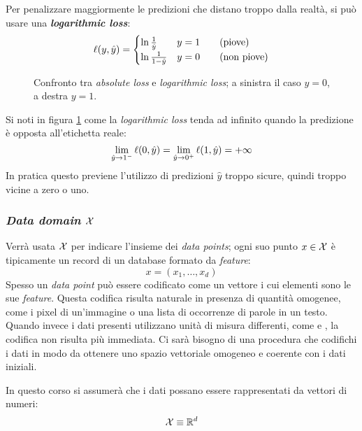 Per penalizzare maggiormente le predizioni che distano troppo dalla realtà, si può usare una
\textit{\textbf{logarithmic loss}}:
$$ \ell(y,\hat{y}) = \begin{cases} \ln{\frac{1}{\hat{y}}} & y=1 \qquad 
(\text{piove}) \\ \ln{\frac{1}{1-\hat{y}}} & y=0 \qquad (\text{non piove}) \end{cases} $$

\begin{figure}[h]
    \centering
    \begin{subfigure}{.43\textwidth}
        \centering
        
    \end{subfigure}
    \begin{subfigure}{.43\textwidth}
        \centering
        
    \end{subfigure}
    \caption{Confronto tra \textit{\color{cyan}absolute loss} e \textit{\color{orange}
    logarithmic loss}; a sinistra il caso $y=0$, a destra $y=1$. \label{fig:abs_vs_log}}
\end{figure}

Si noti in figura \ref{fig:abs_vs_log} come la \textit{logarithmic loss} tenda ad
infinito quando la predizione è opposta all'etichetta reale:
$$\lim_{\hat{y}\rightarrow 1^-} \ell(0,\hat{y})=\lim_{\hat{y}\rightarrow 0^+}
\ell(1,\hat{y}) = +\infty$$
In pratica questo previene 
l'utilizzo di predizioni $\hat{y}$ troppo sicure, quindi troppo vicine a zero o uno.

\subsubsection{\textit{Data domain} \texorpdfstring{$\mathcal{X}$}{X}}
Verrà usata $\mathcal{X}$ per indicare l'insieme dei \textit{data points}; ogni suo punto $x \in \mathcal{X}$
è tipicamente un record di un database formato da \textit{feature}:
$$ x = (x_1, \dots , x_d) $$
Spesso un \textit{data point} può essere codificato come un vettore i cui elementi sono le
sue \textit{feature}. Questa codifica risulta naturale in presenza di quantità omogenee, come
i pixel di un'immagine o una lista di occorrenze di parole in un testo. Quando invece i dati
presenti utilizzano unità di misura differenti, come  e , la
codifica non risulta più immediata. Ci sarà bisogno di una procedura che codifichi i dati
in modo da ottenere uno spazio vettoriale omogeneo e coerente con i dati iniziali.

In questo corso si assumerà che i dati possano essere rappresentati da vettori di numeri:
$$ \mathcal{X} \equiv \mathbb{R}^d $$

